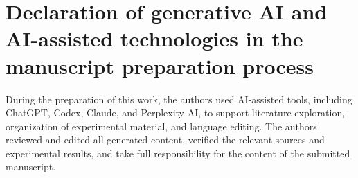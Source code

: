 \section*{Declaration of generative AI and AI-assisted technologies in the manuscript preparation process}
During the preparation of this work, the authors used AI-assisted tools, including ChatGPT, Codex, Claude, and Perplexity AI, to support literature exploration, organization of experimental material, and language editing. The authors reviewed and edited all generated content, verified the relevant sources and experimental results, and take full responsibility for the content of the submitted manuscript.
